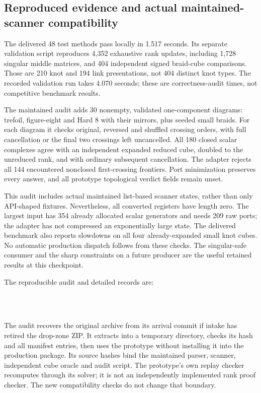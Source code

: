 \subsection{Reproduced evidence and actual maintained-scanner compatibility}
The delivered 48 test methods pass locally in 1.517 seconds. Its separate
validation script reproduces 4,352 exhaustive rank updates, including 1,728
singular middle matrices, and 404 independent signed braid-cube comparisons.
Those are 210 knot and 194 link presentations, not 404 distinct knot types.
The recorded validation run takes 4.070 seconds; these are correctness-audit
times, not competitive benchmark results.

The maintained audit adds 30 nonempty, validated one-component diagrams:
trefoil, figure-eight and Hard 8 with their mirrors, plus seeded small braids.
For each diagram it checks original, reversed and shuffled crossing orders,
with full cancellation or the final two crossings left uncancelled. All 180
closed scalar complexes agree with an independent expanded reduced cube,
doubled to the unreduced rank, and with ordinary subsequent cancellation.
The adapter rejects all 144 encountered nonclosed first-crossing frontiers.
Port minimization preserves every answer, and all prototype topological
verdict fields remain unset.

This audit includes actual maintained list-based scanner states, rather than
only API-shaped fixtures. Nevertheless, all converted registers have length
zero. The largest input has 354 already allocated scalar generators and needs
209 raw ports; the adapter has not compressed an exponentially large state.
The delivered benchmark also reports slowdowns on all four already-expanded
small knot cubes. No automatic production dispatch follows from these checks.
The singular-safe consumer and the sharp constraints on a future producer are
the useful retained results at this checkpoint.

The reproducible audit and detailed records are:
\begin{center}\small
{}\\
\\
\end{center}
The audit recovers the original archive from its arrival commit if intake
has retired the drop-zone ZIP. It extracts into a temporary directory, checks
its hash and all manifest entries, then uses the prototype without installing
it into the production package. Its source hashes bind the maintained parser,
scanner, independent cube oracle and audit script. The prototype's own replay
checker recomputes through its solver; it is not an independently implemented
rank proof checker. The new compatibility checks do not change that boundary.
